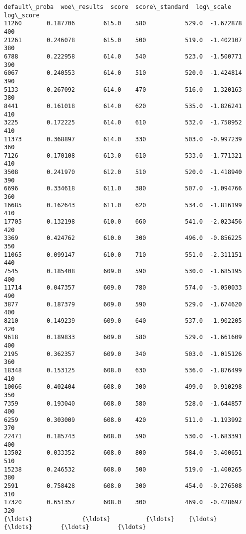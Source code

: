 \documentclass[11pt]{article}
\begin{document}
    \begin{Verbatim}[commandchars=\\\{\}]
       default\_proba  woe\_results  score  score\_standard  log\_scale  log\_score
11260       0.187706        615.0    580           529.0  -1.672878        400
21261       0.246078        615.0    500           519.0  -1.402107        380
6788        0.222958        614.0    540           523.0  -1.500771        390
6067        0.240553        614.0    510           520.0  -1.424814        390
5133        0.267092        614.0    470           516.0  -1.320163        380
8441        0.161018        614.0    620           535.0  -1.826241        410
3225        0.172225        614.0    610           532.0  -1.758952        410
11373       0.368897        614.0    330           503.0  -0.997239        360
7126        0.170108        613.0    610           533.0  -1.771321        410
3508        0.241970        612.0    510           520.0  -1.418940        390
6696        0.334618        611.0    380           507.0  -1.094766        360
16685       0.162643        611.0    620           534.0  -1.816199        410
17705       0.132198        610.0    660           541.0  -2.023456        420
3369        0.424762        610.0    300           496.0  -0.856225        350
11065       0.099147        610.0    710           551.0  -2.311151        440
7545        0.185408        609.0    590           530.0  -1.685195        400
11714       0.047357        609.0    780           574.0  -3.050033        490
3877        0.187379        609.0    590           529.0  -1.674620        400
8210        0.149239        609.0    640           537.0  -1.902205        420
9618        0.189833        609.0    580           529.0  -1.661609        400
2195        0.362357        609.0    340           503.0  -1.015126        360
18348       0.153125        608.0    630           536.0  -1.876499        410
10066       0.402404        608.0    300           499.0  -0.910298        350
7359        0.193040        608.0    580           528.0  -1.644857        400
6259        0.303009        608.0    420           511.0  -1.193992        370
22471       0.185743        608.0    590           530.0  -1.683391        400
13502       0.033352        608.0    800           584.0  -3.400651        510
15238       0.246532        608.0    500           519.0  -1.400265        380
2591        0.758428        608.0    300           454.0  -0.276508        310
17320       0.651357        608.0    300           469.0  -0.428697        320
{\ldots}              {\ldots}          {\ldots}    {\ldots}             {\ldots}        {\ldots}        {\ldots}

\end{Verbatim}
\end{document}
